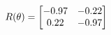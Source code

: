 \documentclass[preview]{standalone}
\begin{document}
\begin{align*}
\special{dvisvgm:raw <g id='unique000'>}R(\theta) = \begin{bmatrix}-0.97 & -0.22\\0.22 & -0.97\end{bmatrix}\special{dvisvgm:raw </g>}
\end{align*}
\end{document}
